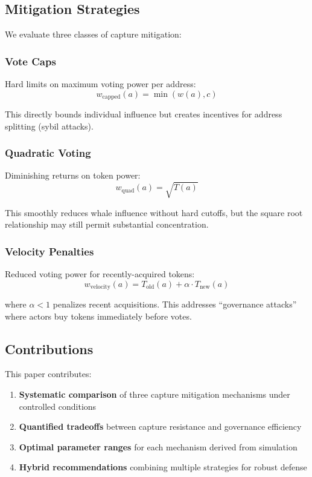 \subsection{Mitigation Strategies}

We evaluate three classes of capture mitigation:

\subsubsection{Vote Caps}

Hard limits on maximum voting power per address:
\begin{equation}
w_{\text{capped}}(a) = \min(w(a), c)
\end{equation}

This directly bounds individual influence but creates incentives for address splitting (sybil attacks).

\subsubsection{Quadratic Voting}

Diminishing returns on token power:
\begin{equation}
w_{\text{quad}}(a) = \sqrt{T(a)}
\end{equation}

This smoothly reduces whale influence without hard cutoffs, but the square root relationship may still permit substantial concentration.

\subsubsection{Velocity Penalties}

Reduced voting power for recently-acquired tokens:
\begin{equation}
w_{\text{velocity}}(a) = T_{\text{old}}(a) + \alpha \cdot T_{\text{new}}(a)
\end{equation}

where $\alpha < 1$ penalizes recent acquisitions. This addresses ``governance attacks'' where actors buy tokens immediately before votes.

\subsection{Contributions}

This paper contributes:

\begin{enumerate}
    \item \textbf{Systematic comparison} of three capture mitigation mechanisms under controlled conditions
    \item \textbf{Quantified tradeoffs} between capture resistance and governance efficiency
    \item \textbf{Optimal parameter ranges} for each mechanism derived from simulation
    \item \textbf{Hybrid recommendations} combining multiple strategies for robust defense
\end{enumerate}

